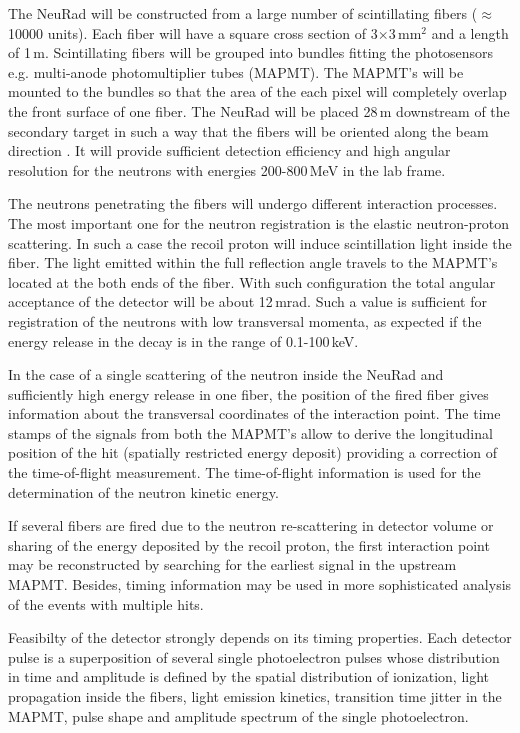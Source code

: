 \documentclass{webofc}
\begin{document}
The NeuRad will be constructed from a large number of scintillating fibers ($\approx$10000 units). Each fiber will have a square cross section of 3$\times$3\,mm$^2$ and a length of 1\,m. Scintillating fibers will be grouped into bundles fitting the photosensors e.g. multi-anode photomultiplier tubes (MAPMT). The MAPMT's will be mounted to the bundles so that the area of the each pixel will completely overlap the front surface of one fiber.
%
The NeuRad will be placed 28\,m downstream of the secondary target in such a way that the fibers will be oriented along the beam direction \cite{report}.
It will provide sufficient detection efficiency and high angular resolution for the neutrons with energies 200-800\,MeV in the lab frame.

The neutrons penetrating the fibers will undergo different interaction processes. The most important one for the neutron registration is the elastic neutron-proton scattering. In such a case the recoil proton will induce scintillation light inside the fiber.
The light emitted within the full reflection angle travels to the MAPMT's located at the both ends of the fiber.
With such configuration the total angular acceptance of the detector will be about 12\,mrad.
Such a value is sufficient for registration of the neutrons with low transversal momenta, as expected if the energy release in the decay is in the range of 0.1-100\,keV.

In the case of a single scattering of the neutron inside the NeuRad and sufficiently high energy release in one fiber, the position of the fired fiber gives information about the transversal coordinates of the interaction point. The time stamps of the signals from both the MAPMT's allow to derive the longitudinal position of the hit (spatially restricted energy deposit) providing a correction of the time-of-flight measurement. The time-of-flight information is used for the determination of the neutron kinetic energy. 

If several fibers are fired due to the neutron re-scattering in detector volume or sharing of the energy deposited by the recoil proton, the first interaction point may be reconstructed by searching for the earliest signal in the upstream MAPMT. Besides, timing information may be used in more sophisticated analysis of the events with multiple hits.

Feasibilty of the detector strongly depends on its timing properties. Each detector pulse is a superposition of several single photoelectron pulses whose distribution in time and amplitude is defined by the  spatial distribution of ionization, light propagation inside the fibers, light emission kinetics, transition time jitter in the MAPMT, pulse shape and amplitude spectrum of the single photoelectron.
\end{document}
